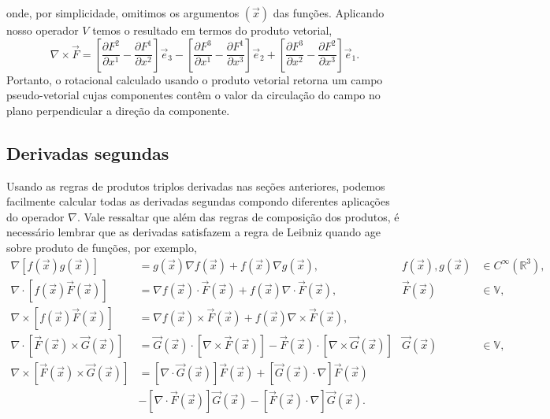 onde, por simplicidade, omitimos os argumentos $(\vec{x})$ das funções.
Aplicando nosso operador $V$ temos o resultado em termos do produto vetorial,
\begin{equation}
	\nabla\times\vec{F} = \left[\frac{\partial F^2}{\partial x^1} - \frac{\partial F^1}{\partial x^2}\right]\vec{e}_3-\left[\frac{\partial F^3}{\partial x^1} - \frac{\partial F^1}{\partial x^3}\right]\vec{e}_2+\left[\frac{\partial F^3}{\partial x^2} - \frac{\partial F^2}{\partial x^3}\right]\vec{e}_1.
\end{equation}
Portanto, o rotacional calculado usando o produto vetorial retorna um campo
pseudo-vetorial cujas componentes contêm o valor da circulação do campo no plano
perpendicular a direção da componente.

\subsection{Derivadas segundas}

Usando as regras de produtos triplos derivadas nas seções anteriores, podemos
facilmente calcular todas as derivadas segundas compondo diferentes aplicações
do operador $\nabla$. Vale ressaltar que além das regras de composição dos
produtos, é necessário lembrar que as derivadas satisfazem a regra de Leibniz
quando age sobre produto de funções, por exemplo,
\begin{align}
	\label{leibniz1} \nabla\left[f(\vec{x})g(\vec{x})\right]                        & = g(\vec{x})\nabla f(\vec{x})+f(\vec{x})\nabla g(\vec{x}),                                                                        & f(\vec{x}), g(\vec{x}) & \in C^\infty(\mathbb{R}^3), \\
	\nabla\cdot\left[f(\vec{x})\vec{F}(\vec{x})\right]                              & = \nabla f(\vec{x})\cdot\vec{F}(\vec{x}) + f(\vec{x})\nabla \cdot\vec{F}(\vec{x}),                                                & \vec{F}(\vec{x})       & \in \mathbb{V},             \\
	\nabla\times\left[f(\vec{x})\vec{F}(\vec{x})\right]                             & = \nabla f(\vec{x})\times\vec{F}(\vec{x}) + f(\vec{x})\nabla \times\vec{F}(\vec{x}),                                                                                                     \\
	\label{leibnizl} \nabla\cdot\left[\vec{F}(\vec{x})\times\vec{G}(\vec{x})\right] & = \vec{G}(\vec{x})\cdot\left[\nabla\times\vec{F}(\vec{x})\right] - \vec{F}(\vec{x})\cdot\left[\nabla\times\vec{G}(\vec{x})\right] & \vec{G}(\vec{x})       & \in \mathbb{V},             \\
	\label{leibnizf}\nabla\times\left[\vec{F}(\vec{x})\times\vec{G}(\vec{x})\right] & = \left[\nabla\cdot\vec{G}(\vec{x})\right]\vec{F}(\vec{x}) + \left[\vec{G}(\vec{x})\cdot\nabla\right]\vec{F}(\vec{x})                                                                    \\
	                                                                                & - \left[\nabla\cdot\vec{F}(\vec{x})\right]\vec{G}(\vec{x}) - \left[\vec{F}(\vec{x})\cdot\nabla\right]\vec{G}(\vec{x}).
\end{align}

